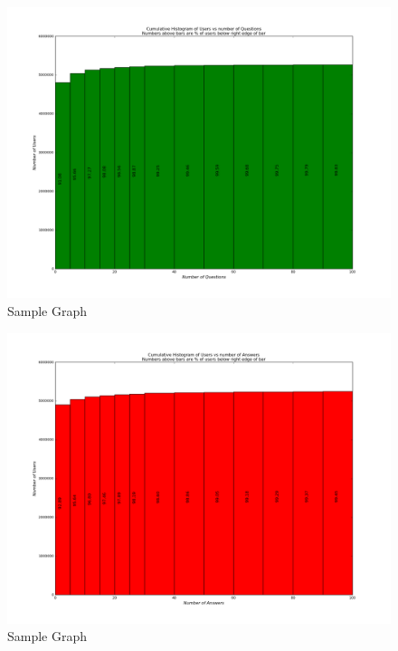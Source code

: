 \documentclass{article}
\begin{document}
\begin{figure}[H]
\centering
\includegraphics[width=12cm]{results_ver2/so_user_quescnt_hist.png}
\caption{Sample Graph}
\label{fig1:overview}
\end{figure}
\begin{figure}[H]
\centering
\includegraphics[width=12cm]{results_ver2/so_user_anscnt_hist.png}
\caption{Sample Graph}
\label{fig1:overview}
\end{figure}
\end{document}

